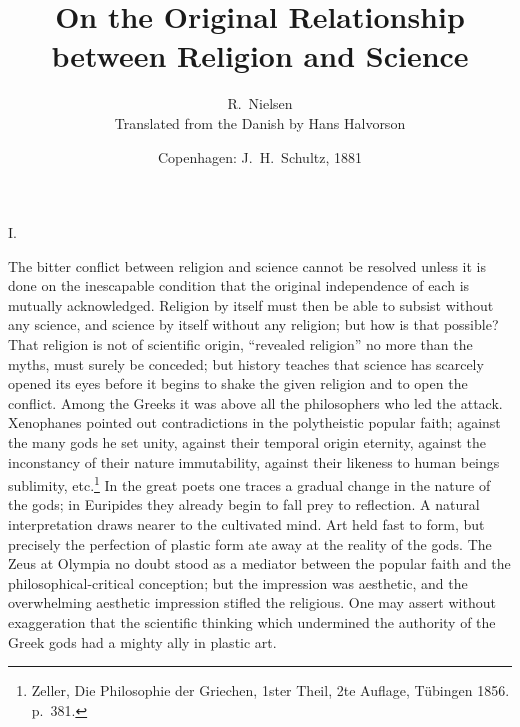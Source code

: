 \documentclass[12pt,a4paper]{article}
\title{\textbf{On the Original Relationship\\[4pt]
       between Religion and Science}}
\author{R.\ Nielsen\\[4pt]
  \small Translated from the Danish by Hans Halvorson}
\date{Copenhagen: J.\ H.\ Schultz, 1881}
\newcommand{\opage}[1]{\marginnote{\footnotesize\textit{[#1]}}}
\begin{document}
\maketitle
\thispagestyle{fancy}

\bigskip

\begin{center}I.\end{center}

\noindent The bitter conflict between religion and science cannot be
resolved unless it is done on the inescapable condition that the
original independence of each is mutually acknowledged. Religion by
itself must then be able to subsist without any science, and science by
itself without any religion; but how is that possible? That religion is
not of scientific origin, ``revealed religion'' no more than the myths,
must surely be conceded; but history teaches that science has scarcely
opened its eyes before it begins to shake the given religion and to
open the conflict. Among the Greeks it was above all the philosophers
who led the attack. Xenophanes pointed out contradictions in the
polytheistic popular faith; against the many gods he set unity, against
their temporal origin eternity, against the inconstancy of their nature
immutability, against their likeness to human beings sublimity,
etc.\footnote{Zeller, Die Philosophie der Griechen, 1ster Theil, 2te
Auflage, Tübingen 1856. p.\ 381.} %
In the great poets one traces a gradual change in the nature of the
gods; in Euripides they already begin to fall prey to reflection. A
natural interpretation draws nearer to the cultivated mind. Art held
fast to form, but precisely the perfection of plastic form ate away at
the reality of the gods. The Zeus at Olympia no doubt stood as a
mediator between the popular faith and the philosophical-critical
conception; but the impression was aesthetic, and the overwhelming
aesthetic impression stifled the religious. One \opage{2} may assert
without exaggeration that the scientific thinking which undermined the
authority of the Greek gods had a mighty ally in plastic art.
\end{document}

